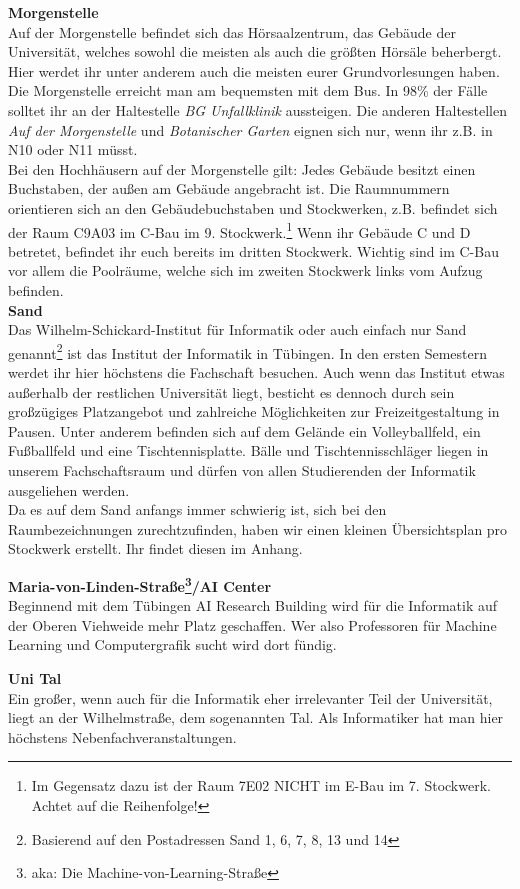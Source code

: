 \textbf{Morgenstelle}\\
Auf der Morgenstelle befindet sich das Hörsaalzentrum, das Gebäude der Universität, welches sowohl die meisten als auch die größten Hörsäle beherbergt. Hier werdet ihr unter anderem auch die meisten eurer Grundvorlesungen haben.\\
Die Morgenstelle erreicht man am bequemsten mit dem Bus. In 98\% der Fälle solltet ihr an der Haltestelle \emph{BG Unfallklinik} aussteigen. Die anderen Haltestellen \emph{Auf der Morgenstelle} und \emph{Botanischer Garten} eignen sich nur, wenn ihr z.B. in N10 oder N11 müsst.\\ Bei den Hochhäusern auf der Morgenstelle gilt: Jedes Gebäude besitzt einen Buchstaben, der außen am Gebäude angebracht ist.  Die Raumnummern orientieren sich an den Gebäudebuchstaben und Stockwerken, z.B. befindet sich der Raum C9A03 im C-Bau im 9. Stockwerk.\footnote{Im Gegensatz dazu ist der Raum 7E02 NICHT im E-Bau im 7. Stockwerk. Achtet auf die Reihenfolge!} Wenn ihr Gebäude C und D betretet, befindet ihr euch bereits im dritten Stockwerk. Wichtig sind im C-Bau vor allem die Poolräume, welche sich im zweiten Stockwerk links vom Aufzug befinden. \\

\textbf{Sand}\\
Das Wilhelm-Schickard-Institut für Informatik oder auch einfach nur Sand genannt\footnote{Basierend auf den Postadressen Sand 1, 6, 7, 8, 13 und 14} ist das Institut der Informatik in Tübingen. In den ersten Semestern werdet ihr hier höchstens die Fachschaft besuchen. Auch wenn das Institut etwas außerhalb der restlichen Universität liegt, besticht es dennoch durch sein großzügiges Platzangebot und zahlreiche Möglichkeiten zur Freizeitgestaltung in Pausen. Unter anderem befinden sich auf dem Gelände ein Volleyballfeld, ein Fußballfeld und eine Tischtennisplatte. Bälle und Tischtennisschläger liegen in unserem Fachschaftsraum und dürfen von allen Studierenden der Informatik ausgeliehen werden.\\
Da es auf dem Sand anfangs immer schwierig ist, sich bei den Raumbezeichnungen zurechtzufinden, haben wir einen kleinen Übersichtsplan pro Stockwerk erstellt. Ihr findet diesen im Anhang.

\textbf{Maria-von-Linden-Straße\footnote{aka: Die Machine-von-Learning-Straße}/AI Center}\\
Beginnend mit dem Tübingen AI Research Building wird für die Informatik auf der Oberen Viehweide mehr Platz geschaffen. Wer also Professoren für Machine Learning und Computergrafik sucht wird dort fündig.

\textbf{Uni Tal}\\
Ein großer, wenn auch für die Informatik eher irrelevanter Teil der Universität, liegt an der Wilhelmstraße, dem sogenannten Tal. Als Informatiker hat man hier höchstens Nebenfachveranstaltungen.
\vfill
